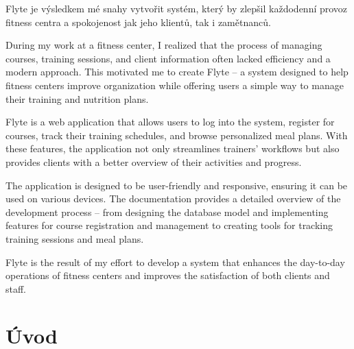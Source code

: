 \documentclass[12pt, a4paper,
twoside,        %
openany
]{report}
\renewcommand{\headrulewidth}{0.025pt}
\begin{document}
Flyte je výsledkem mé snahy vytvořit systém, který by zlepšil každodenní provoz fitness centra a spokojenost jak jeho klientů, tak i zamětnanců.
	
	\vspace{18pt}
	

	
	\noindent During my work at a fitness center, I realized that the process of managing courses, training sessions, and client information often lacked efficiency and a modern approach. This motivated me to create Flyte – a system designed to help fitness centers improve organization while offering users a simple way to manage their training and nutrition plans.

Flyte is a web application that allows users to log into the system, register for courses, track their training schedules, and browse personalized meal plans. With these features, the application not only streamlines trainers' workflows but also provides clients with a better overview of their activities and progress.

The application is designed to be user-friendly and responsive, ensuring it can be used on various devices. The documentation provides a detailed overview of the development process – from designing the database model and implementing features for course registration and management to creating tools for tracking training sessions and meal plans.

Flyte is the result of my effort to develop a system that enhances the day-to-day operations of fitness centers and improves the satisfaction of both clients and staff.
	
	\vspace{18pt}

	

	
	\tableofcontents %

\pagestyle{fancy}
\fancyhf{}
\fancyfoot[C]{\thepage} %
\renewcommand{\headrulewidth}{0pt} %

	\chapter*{Úvod\vspace{-1cm}}
\end{document}
